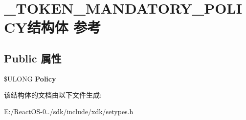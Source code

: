 \hypertarget{struct___t_o_k_e_n___m_a_n_d_a_t_o_r_y___p_o_l_i_c_y}{}\section{\+\_\+\+T\+O\+K\+E\+N\+\_\+\+M\+A\+N\+D\+A\+T\+O\+R\+Y\+\_\+\+P\+O\+L\+I\+C\+Y结构体 参考}
\label{struct___t_o_k_e_n___m_a_n_d_a_t_o_r_y___p_o_l_i_c_y}
\subsection*{Public 属性}
\begin{DoxyCompactItemize}
\item 
\mbox{\label{struct___t_o_k_e_n___m_a_n_d_a_t_o_r_y___p_o_l_i_c_y_addea6afcf2099cfcc34e8ff74b0e2d91}} 
\$U\+L\+O\+NG {\bfseries Policy}
\end{DoxyCompactItemize}


该结构体的文档由以下文件生成\+:\begin{DoxyCompactItemize}
\item 
E\+:/\+React\+O\+S-\/0../sdk/include/xdk/setypes.\+h\end{DoxyCompactItemize}
